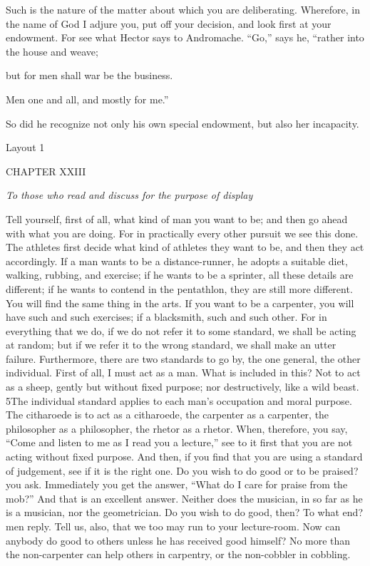Such is the nature of the matter about which you are deliberating. Wherefore, in the name of God I adjure you, put off your decision, and look first at your endowment. For see what Hector says to Andromache. ``Go,'' says he, ``rather into the house and weave;

but for men shall war be the business.

Men one and all, and mostly for me.''

So did he recognize not only his own special endowment, but also her incapacity.



Layout 1

CHAPTER XXIII

\emph{To those who read and discuss for the purpose of display}

Tell yourself, first of all, what kind of man you want to be; and then go ahead with what you are doing. For in practically every other pursuit we see this done. The athletes first decide what kind of athletes they want to be, and then they act accordingly. If a man wants to be a distance-runner, he adopts a suitable diet, walking, rubbing, and exercise; if he wants to be a sprinter, all these details are different; if he wants to contend in the pentathlon, they are still more different. You will find the same thing in the arts. If you want to be a carpenter, you will have such and such exercises; if a blacksmith, such and such other. For in everything that we do, if we do not refer it to some standard, we shall be acting at random; but if we refer it to the wrong standard, we shall make an utter failure. Furthermore, there are two standards to go by, the one general, the other individual. First of all, I must act as a man. What is included in this? Not to act as a sheep, gently but without fixed purpose; nor destructively, like a wild beast. 5The individual standard applies to each man's occupation and moral purpose. The citharoede is to act as a citharoede, the carpenter as a carpenter, the philosopher as a philosopher, the rhetor as a rhetor. When, therefore, you say, ``Come and listen to me as I read you a lecture,'' see to it first that you are not acting without fixed purpose. And then, if you find that you are using a standard of judgement, see if it is the right one. Do you wish to do good or to be praised? you ask. Immediately you get the answer, ``What do I care for praise from the mob?'' And that is an excellent answer. Neither does the musician, in so far as he is a musician, nor the geometrician. Do you wish to do good, then? To what end? men reply. Tell us, also, that we too may run to your lecture-room. Now can anybody do good to others unless he has received good himself? No more than the non-carpenter can help others in carpentry, or the non-cobbler in cobbling.


